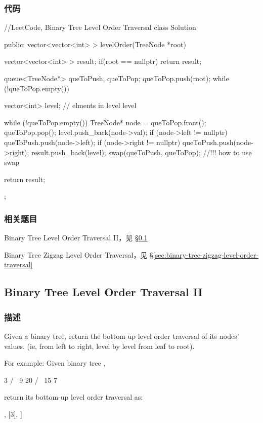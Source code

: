\subsubsection{代码}
\begin{Code}
//LeetCode, Binary Tree Level Order Traversal
class Solution {
public:
    vector<vector<int> > levelOrder(TreeNode *root) {
        vector<vector<int> > result;
        if(root == nullptr) return result;

        queue<TreeNode*> queToPush, queToPop;
        queToPop.push(root);
        while (!queToPop.empty()) {
            vector<int> level; // elments in level level

            while (!queToPop.empty()) {
                TreeNode* node = queToPop.front();
                queToPop.pop();
                level.push_back(node->val);
                if (node->left != nullptr) queToPush.push(node->left);
                if (node->right != nullptr) queToPush.push(node->right);
            }
            result.push_back(level);
            swap(queToPush, queToPop); //!!! how to use swap
        }
        return result;
    }
};
\end{Code}


\subsubsection{相关题目}
\begindot
\item Binary Tree Level Order Traversal II，见 \S \ref{sec:binary-tree-tevel-order-traversal-ii}
\item Binary Tree Zigzag Level Order Traversal，见 \S \ref{sec:binary-tree-zigzag-level-order-traversal}
\myenddot


\subsection{Binary Tree Level Order Traversal II}
\label{sec:binary-tree-tevel-order-traversal-ii}


\subsubsection{描述}
Given a binary tree, return the bottom-up level order traversal of its nodes' values. (ie, from left to right, level by level from leaf to root).

For example:
Given binary tree ,
\begin{Code}
    3
   / \
  9  20
    /  \
   15   7
\end{Code}
return its bottom-up level order traversal as:
\begin{Code}
[
  [15,7]
  [9,20],
  [3],
]
\end{Code}


